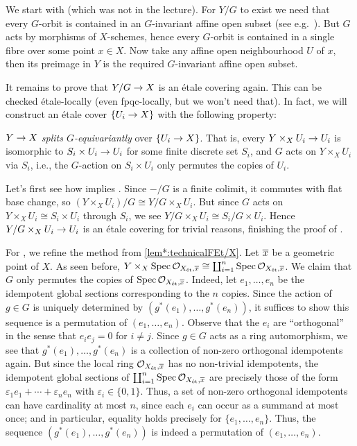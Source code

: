 \begin{proof*}
	We start with  (which was not in the lecture). For $Y/G$ to exist we need that every $G$-orbit is contained in an $G$-invariant affine open subset (see e.g.\ \cite[Theorem~11]{jacobians}). But $G$ acts by morphisms of $X$-schemes, hence every $G$-orbit is contained in a single fibre over some point $x\in X$. Now take any affine open neighbourhood $U$ of $x$, then its preimage in $Y$ is the required $G$-invariant affine open subset.
	
	It remains to prove that $Y/G\morphism X$ is an étale covering again. This can be checked étale-locally (even fpqc-locally, but we won't need that). In fact, we will construct an étale cover $\{U_i\morphism X\}$ with the following property:
	\begin{alphanumerate}
		\item[\itememph{*}] $Y\morphism X$ \emph{splits $G$-equivariantly} over $\{U_i\morphism X\}$. That is, every $Y\times_XU_i\morphism U_i$ is isomorphic to $S_i\times U_i\morphism U_i$ for some finite discrete set $S_i$, and $G$ acts on $Y\times_XU_i$ via $S_i$, i.e., the $G$-action on $S_i\times U_i$ only permutes the copies of $U_i$.
	\end{alphanumerate}
	Let's first see how \itememph{*} implies . Since $-/G$ is a finite colimit, it commutes with flat base change, so $(Y\times_XU_i)/G\cong Y/G\times_XU_i$. But since $G$ acts on $Y\times_XU_i\cong S_i\times U_i$  through $S_i$, we see $Y/G\times_XU_i\cong S_i/G\times U_i$. Hence $Y/G\times_XU_i\morphism U_i$ is an étale covering for trivial reasons, finishing the proof of .
	
	For \itememph{*}, we refine the method from \cref{lem*:technicalFEt/X}. Let $\ov{x}$ be a geometric point of $X$. As seen before, $Y\times_X\Spec \Oo_{X_\et,\ov{x}}\cong \coprod_{i=1}^n\Spec \Oo_{X_\et,\ov{x}}$. We claim that $G$ only permutes the copies of $\Spec \Oo_{X_\et,\ov{x}}$. Indeed, let $e_1,\ldots,e_n$ be the idempotent global sections corresponding to the $n$ copies. Since the action of $g\in G$ is uniquely determined by $(g^*(e_1),\dotsc,g^*(e_n))$, it suffices to show this sequence is a permutation of $(e_1,\dotsc,e_n)$. Observe that the $e_i$ are \enquote{orthogonal} in the sense that $e_ie_j=0$ for $i\neq j$. Since $g\in G$ acts as a ring automorphism, we see that $g^*(e_1),\dotsc,g^*(e_n)$ is a collection of non-zero orthogonal idempotents again. But since the local ring $\Oo_{X_\et,\ov{x}}$ has no non-trivial idempotents, the idempotent global sections of $\coprod_{i=1}^n\Spec \Oo_{X_\et,\ov{x}}$ are precisely those of the form $\varepsilon_1e_1+\dotsb+\varepsilon_ne_n$ with $\varepsilon_i\in\{0,1\}$. Thus, a set of non-zero orthogonal idempotents can have cardinality at most $n$, since each $e_i$ can occur as a summand at most once; and in particular, equality holds precisely for $\{e_1,\dotsc,e_n\}$. Thus, the sequence $(g^*(e_1),\dotsc,g^*(e_n))$ is indeed a permutation of $(e_1,\dotsc,e_n)$.
	

\end{proof*}
